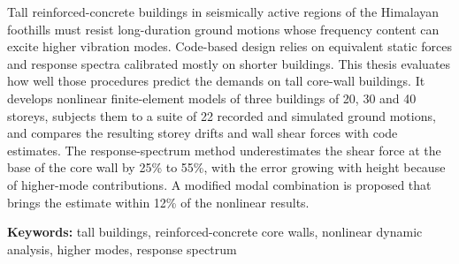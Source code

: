 Tall reinforced-concrete buildings in seismically active regions of the Himalayan foothills must
resist long-duration ground motions whose frequency content can excite higher vibration modes.
Code-based design relies on equivalent static forces and response spectra calibrated mostly on
shorter buildings. This thesis evaluates how well those procedures predict the demands on tall
core-wall buildings. It develops nonlinear finite-element models of three buildings of 20, 30
and 40 storeys, subjects them to a suite of 22 recorded and simulated ground motions, and compares
the resulting storey drifts and wall shear forces with code estimates. The response-spectrum
method underestimates the shear force at the base of the core wall by 25\% to 55\%, with the
error growing with height because of higher-mode contributions. A modified modal combination is
proposed that brings the estimate within 12\% of the nonlinear results.

\medskip\noindent\textbf{Keywords:} tall buildings, reinforced-concrete core walls, nonlinear
dynamic analysis, higher modes, response spectrum
